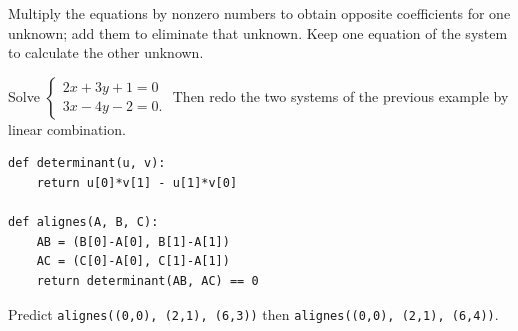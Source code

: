 \begin{method}
Multiply the equations by nonzero numbers to obtain opposite coefficients for one unknown; add them to eliminate that unknown. Keep one equation of the system to calculate the other unknown.
\end{method}
\begin{example}Solve $\begin{cases}2x+3y+1=0\\3x-4y-2=0.\end{cases}$ Then redo the two systems of the previous example by linear combination.\end{example}
\begin{lstlisting}
def determinant(u, v):
    return u[0]*v[1] - u[1]*v[0]

def alignes(A, B, C):
    AB = (B[0]-A[0], B[1]-A[1])
    AC = (C[0]-A[0], C[1]-A[1])
    return determinant(AB, AC) == 0
\end{lstlisting}
\begin{example}Predict \texttt{alignes((0,0), (2,1), (6,3))} then \texttt{alignes((0,0), (2,1), (6,4))}.\end{example}
